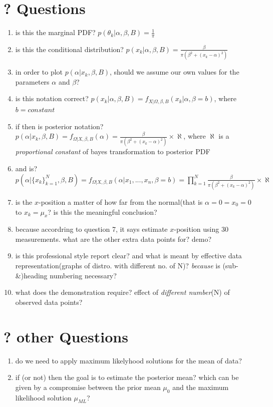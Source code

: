 \documentclass[a4paper,11pt]{article}
\begin{document}
\section{? Questions}
	\begin{enumerate}

		\item is this the marginal PDF? $p(\theta_k | \alpha, \beta, B) = \frac{1}{\pi}$
		\item is this the conditional distribution? $p(x_k | \alpha, \beta, B) = \frac{\beta}{\pi (\beta^2 + (x_k - \alpha)^2)}$
		\item in order to plot $p(\alpha | x_k, \beta, B)$, should we assume our own values for the parameters $\alpha$ and $\beta$?
		\item is this notation correct? $ p(x_k | \alpha, \beta, B) = f_{X | \Omega, \beta, B}(x_k | \alpha, \beta = b)$, where $b = constant$
		\item if then is posterior notation? $p(\alpha | x_k, \beta, B) = f_{\Omega | X, \beta, B}(\alpha) = \frac{\beta}{\pi (\beta^2 + (x_k - \alpha)^2)} \times \aleph$, where $\aleph$ is a \emph{proportional constant} of bayes transformation to posterior PDF
		\item and is? $p(\alpha | \{x_k\}^N _{k = 1}, \beta, B) = f_{\Omega | X, \beta, B}(\alpha | x_1,...,x_n, \beta = b ) = \prod^N _{k = 1} \frac{\beta}{\pi (\beta^2 + (x_k - \alpha)^2)} \times \aleph $
		\item is the $x$-position a matter of how far from the normal(that is $\alpha = 0 = x_0 = 0$ to $x_k = \mu_x$? is this the meaningful conclusion?
		\item because accordring to question 7, it says estimate $x$-position using 30 measurements. what are the other extra data points for? demo?  
		\item is this professional style report clear? and what is meant by effective data representation(graphs of distro. with different no. of N)? \emph{because} is (sub-\&)heading numbering necessary?		
		\item what does the demonstration require? effect of \emph{different number}(N) of observed data points?
		
	\end{enumerate}
	
\section{? other Questions}
	\begin{enumerate}
		\item do we need to apply maximum likelyhood solutions for the mean of data?
		\item if (or not) then the goal is to estimate the posterior mean? which can be given by a compromise between the prior mean $\mu_0$ and the maximum likelihood solution $\mu_{ML}$?
	\end{enumerate}
\end{document}

